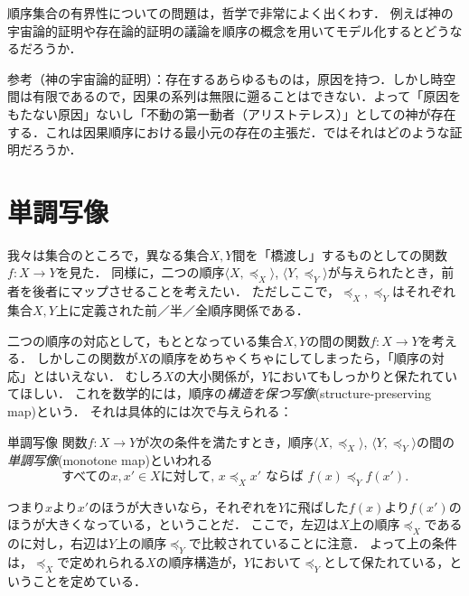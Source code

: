 \documentclass[dvipdfmx,11pt,a4paper]{jsarticle}
\begin{document}


\begin{rei}{}{}
順序集合の有界性についての問題は，哲学で非常によく出くわす．
例えば神の宇宙論的証明や存在論的証明の議論を順序の概念を用いてモデル化するとどうなるだろうか．

参考（神の宇宙論的証明）：存在するあらゆるものは，原因を持つ．しかし時空間は有限であるので，因果の系列は無限に遡ることはできない．よって「原因をもたない原因」ないし「不動の第一動者（アリストテレス）」としての神が存在する．これは因果順序における最小元の存在の主張だ．ではそれはどのような証明だろうか．
\end{rei}


\section{単調写像}
我々は集合のところで，異なる集合$X, Y$間を「橋渡し」するものとしての関数$f:X \to Y$を見た．
同様に，二つの順序$\langle X, \preceq_X \rangle$, $\langle Y, \preceq_Y \rangle$が与えられたとき，前者を後者にマップさせることを考えたい．
ただしここで，$\preceq_X, \preceq_Y$はそれぞれ集合$X,Y$上に定義された前／半／全順序関係である．

二つの順序の対応として，もととなっている集合$X, Y$の間の関数$f:X \to Y$を考える．
しかしこの関数が$X$の順序をめちゃくちゃにしてしまったら，「順序の対応」とはいえない．
むしろ$X$の大小関係が，$Y$においてもしっかりと保たれていてほしい．
これを数学的には，順序の\emph{構造を保つ写像}(structure-preserving map)という．
それは具体的には次で与えられる：
\begin{dfn}{単調写像}{}
関数$f:X \to Y$が次の条件を満たすとき，順序$\langle X, \preceq_X \rangle$, $\langle Y, \preceq_Y \rangle$の間の\emph{単調写像}(monotone map)といわれる
\[
 \text{すべての}x, x' \in X \text{に対して, }  x \preceq_X x' \text{ ならば } f(x) \preceq_Y f(x').
\]
\end{dfn}
つまり$x$より$x'$のほうが大きいなら，それぞれを$Y$に飛ばした$f(x)$より$f(x')$のほうが大きくなっている，ということだ．
ここで，左辺は$X$上の順序$\preceq_X$であるのに対し，右辺は$Y$上の順序$\preceq_Y$で比較されていることに注意．
よって上の条件は，$\preceq_X$で定めれられる$X$の順序構造が，$Y$において$\preceq_Y$として保たれている，ということを定めている．
\end{document}
